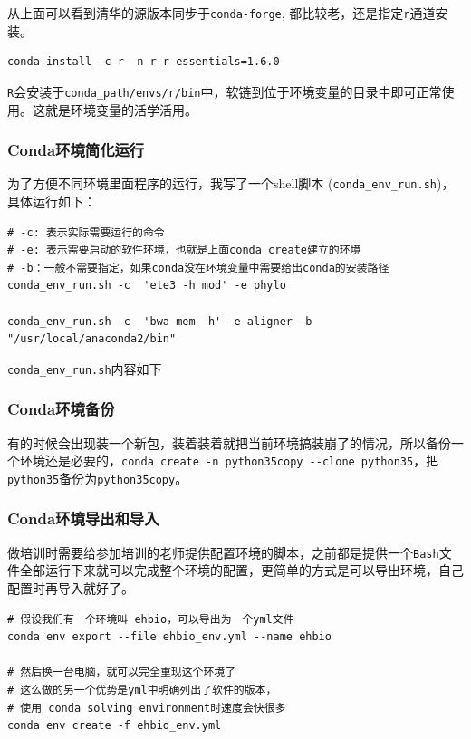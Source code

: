 \documentclass[]{article}
\numberwithin{figure}{section}
\numberwithin{table}{section}
\begin{document}
从上面可以看到清华的源版本同步于\texttt{conda-forge}, 都比较老，还是指定\texttt{r}通道安装。

\begin{verbatim}
conda install -c r -n r r-essentials=1.6.0
\end{verbatim}

\texttt{R}会安装于\texttt{conda\_path/envs/r/bin}中，软链到位于环境变量的目录中即可正常使用。这就是环境变量的活学活用。

\hypertarget{conda_simple}{%
\subsubsection{Conda环境简化运行}\label{conda_simple}}

为了方便不同环境里面程序的运行，我写了一个shell脚本 (\texttt{conda\_env\_run.sh})，具体运行如下：

\begin{verbatim}
# -c: 表示实际需要运行的命令
# -e: 表示需要启动的软件环境，也就是上面conda create建立的环境
# -b：一般不需要指定，如果conda没在环境变量中需要给出conda的安装路径
conda_env_run.sh -c  'ete3 -h mod' -e phylo

conda_env_run.sh -c  'bwa mem -h' -e aligner -b "/usr/local/anaconda2/bin"
\end{verbatim}

\texttt{conda\_env\_run.sh}内容如下

\hypertarget{conda_bak}{%
\subsubsection{Conda环境备份}\label{conda_bak}}

有的时候会出现装一个新包，装着装着就把当前环境搞装崩了的情况，所以备份一个环境还是必要的，\texttt{conda\ create\ -n\ python35copy\ -\/-clone\ python35}，把\texttt{python35}备份为\texttt{python35copy}。

\hypertarget{conda_import}{%
\subsubsection{Conda环境导出和导入}\label{conda_import}}

做培训时需要给参加培训的老师提供配置环境的脚本，之前都是提供一个\texttt{Bash}文件全部运行下来就可以完成整个环境的配置，更简单的方式是可以导出环境，自己配置时再导入就好了。

\begin{verbatim}
# 假设我们有一个环境叫 ehbio，可以导出为一个yml文件
conda env export --file ehbio_env.yml --name ehbio

# 然后换一台电脑，就可以完全重现这个环境了
# 这么做的另一个优势是yml中明确列出了软件的版本，
# 使用 conda solving environment时速度会快很多
conda env create -f ehbio_env.yml
\end{verbatim}
\end{document}
